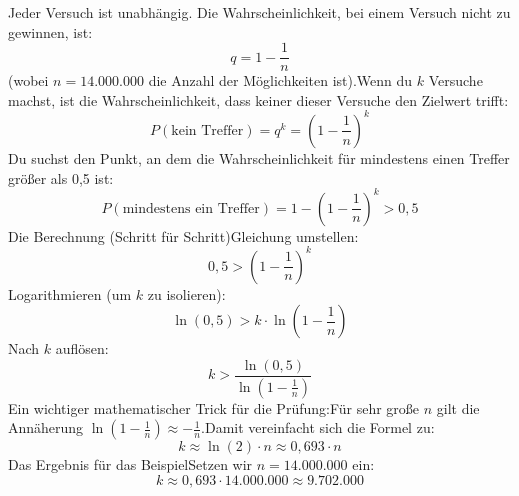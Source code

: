 \documentclass[12pt,DIV=14, version=first, BCOR=10mm,a4paper,twoside,parskip=half-,headsepline,headinclude]{scrartcl}
\begin{document}
Jeder Versuch ist unabhängig. Die Wahrscheinlichkeit, bei einem Versuch nicht zu gewinnen, ist:$$q = 1 - \frac{1}{n}$$(wobei $n = 14.000.000$ die Anzahl der Möglichkeiten ist).Wenn du $k$ Versuche machst, ist die Wahrscheinlichkeit, dass keiner dieser Versuche den Zielwert trifft: $$P(\text{kein Treffer}) = q^k = \left(1 - \frac{1}{n}\right)^k$$ Du suchst den Punkt, an dem die Wahrscheinlichkeit für mindestens einen Treffer größer als 0,5 ist:$$P(\text{mindestens ein Treffer}) = 1 - \left(1 - \frac{1}{n}\right)^k > 0,5$$Die Berechnung (Schritt für Schritt)Gleichung umstellen:$$0,5 > \left(1 - \frac{1}{n}\right)^k$$Logarithmieren (um $k$ zu isolieren):$$\ln(0,5) > k \cdot \ln\left(1 - \frac{1}{n}\right)$$Nach $k$ auflösen:$$k > \frac{\ln(0,5)}{\ln\left(1 - \frac{1}{n}\right)}$$Ein wichtiger mathematischer Trick für die Prüfung:Für sehr große $n$ gilt die Annäherung $\ln(1 - \frac{1}{n}) \approx -\frac{1}{n}$.Damit vereinfacht sich die Formel zu:$$k \approx \ln(2) \cdot n \approx 0,693 \cdot n$$Das Ergebnis für das BeispielSetzen wir $n = 14.000.000$ ein:$$k \approx 0,693 \cdot 14.000.000 \approx 9.702 .000$$
\end{document}

